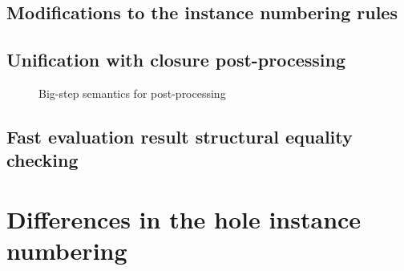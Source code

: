 \subsection{Modifications to the instance numbering rules}
\label{sec:memoization-instance-numbering}

\subsection{Unification with closure post-processing}
\label{sec:unification-postprocessing}

\begin{figure}
  \centering
  \begin{mdframed}
    \begin{singlespace}
      
    \end{singlespace}
  \end{mdframed}
  \caption{Big-step semantics for post-processing}
  \label{fig:big-step-postprocessing-rules}
\end{figure}

\subsection{Fast evaluation result structural equality checking}
\label{sec:fast-equals}

\section{Differences in the hole instance numbering}
\label{sec:differences_numbering}


